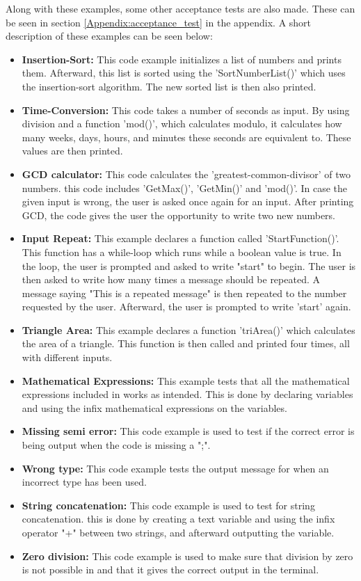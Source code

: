 Along with these examples, some other acceptance tests are also made. These can be seen in section \ref{Appendix:acceptance_test} in the appendix. A short description of these examples can be seen below:

\begin{itemize}
    \item \textbf{Insertion-Sort:} This code example initializes a list of numbers and prints them. Afterward, this list is sorted using the 'SortNumberList()' which uses the insertion-sort algorithm. The new sorted list is then also printed.
    \item \textbf{Time-Conversion:} This code takes a number of seconds as input. By using division and a function 'mod()', which calculates modulo, it calculates how many weeks, days, hours, and minutes these seconds are equivalent to. These values are then printed.
    \item \textbf{GCD calculator:} This code calculates the 'greatest-common-divisor' of two numbers. this code includes 'GetMax()', 'GetMin()' and 'mod()'. In case the given input is wrong, the user is asked once again for an input. After printing GCD, the code gives the user the opportunity to write two new numbers.
    \item \textbf{Input Repeat:} This example declares a function called 'StartFunction()'. This function has a while-loop which runs while a boolean value is true. In the loop, the user is prompted and asked to write "start" to begin. The user is then asked to write how many times a message should be repeated. A message saying "This is a repeated message" is then repeated to the number requested by the user. Afterward, the user is prompted to write 'start' again.
    \item \textbf{Triangle Area:} This example declares a function 'triArea()' which calculates the area of a triangle. This function is then called and printed four times, all with different inputs.
    \item \textbf{Mathematical Expressions:} This example tests that all the mathematical expressions included in \lang works as intended. This is done by declaring variables and using the infix mathematical expressions on the variables.
    \item \textbf{Missing semi error:} This code example is used to test if the correct error is being output when the code is missing a ";".
    \item \textbf{Wrong type:} This code example tests the output message for when an incorrect type has been used.
    \item \textbf{String concatenation:} This code example is used to test for string concatenation. this is done by creating a text variable and using the infix operator "+" between two strings, and afterward outputting the variable.
    \item \textbf{Zero division:} This code example is used to make sure that division by zero is not possible in \lang and that it gives the correct output in the terminal.
\end{itemize}

